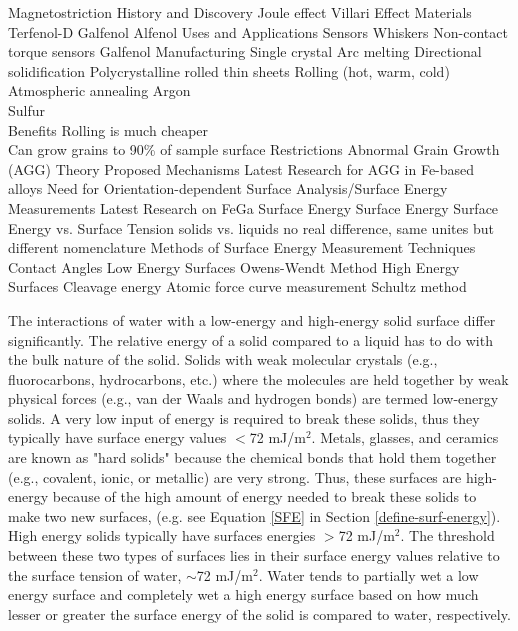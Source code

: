 \documentclass[12pt,letterpaper]{report}
\begin{document}
\begin{outline}[enumerate]
\1 Magnetostriction
	\2 History and Discovery
		\3 Joule effect
		\3 Villari Effect
	\2 Materials
		\3 Terfenol-D
		\3 Galfenol
		\3 Alfenol
	\2 Uses and Applications
		\3 Sensors
			\4 Whiskers
			\4 Non-contact torque sensors
\1 Galfenol
	\2 Manufacturing 
		\3 Single crystal 
			\4 Arc melting
			\4 Directional solidification
		\3 Polycrystalline rolled thin sheets
			\4 Rolling (hot, warm, cold)
			\4 Atmospheric annealing 
				 Argon\\
				 Sulfur\\
			\4 Benefits
				 Rolling is much cheaper\\
				 Can grow grains to 90\% of sample surface
			\4 Restrictions
\1 Abnormal Grain Growth (AGG)
	\2 Theory
	\2 Proposed Mechanisms
	\2 Latest Research for AGG in Fe-based alloys
	\2 Need for Orientation-dependent Surface Analysis/Surface Energy Measurements
		\3 Latest Research on FeGa Surface Energy 
\1 Surface Energy
	\2 Surface Energy vs. Surface Tension
		\3 solids vs. liquids
		\3 no real difference, same unites but different nomenclature
\1 Methods of Surface Energy Measurement Techniques
	\2 Contact Angles
		\3 Low Energy Surfaces
			\4 Owens-Wendt Method
		\3 High Energy Surfaces
			\4 Cleavage energy\cite{Gilman1960}
			\4 Atomic force curve measurement\cite{Drelich2004}
			\4 Schultz method\cite{Schultz1977,Schultz1977a,Schultz1992}
		\3 
\end{outline}



The interactions of water with a low-energy and high-energy solid surface differ significantly. The relative energy of a solid compared to a liquid has to do with the bulk nature of the solid. Solids with weak molecular crystals (e.g., fluorocarbons, hydrocarbons, etc.) where the molecules are held together by weak physical forces (e.g., van der Waals and hydrogen bonds) are termed low-energy solids. A very low input of energy is required to break these solids, thus they typically have surface energy values $<$72 mJ/m$^2$.  Metals, glasses, and ceramics are known as "hard solids" because the chemical bonds that hold them together (e.g., covalent, ionic, or metallic) are very strong. Thus, these surfaces are high-energy because of the high amount of energy needed to break these solids to make two new surfaces, (e.g. see Equation \ref{SFE} in Section \ref{define-surf-energy}). High energy solids typically have surfaces energies $>$72 mJ/m$^2$.  The threshold between these two types of surfaces lies in their surface energy values relative to the surface tension of water, $\sim$72 mJ/m$^2$. Water tends to partially wet a low energy surface and completely wet a high energy surface based on how much lesser or greater the surface energy of the solid is compared to water, respectively. 
\end{document}
